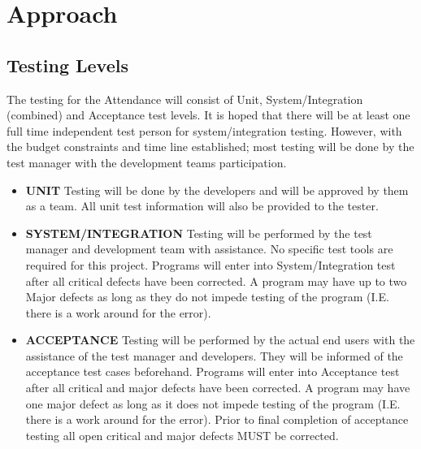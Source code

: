 \documentclass{scrreprt}
\begin{document}
\pagebreak

\chapter{Approach}

\section{Testing Levels}
The testing for the Attendance will consist of Unit, System/Integration (combined) and Acceptance test levels. It is hoped that there will be at least one full time independent test person for system/integration testing. However, with the budget constraints and time line established; most testing will be done by the test manager with the development teams participation.

\begin{itemize}
    \item \textbf{UNIT} Testing will be done by the developers and will be approved by them as a team. All unit test information will also be provided to the tester.
    \item \textbf{SYSTEM/INTEGRATION} Testing will be performed by the test manager and development team with assistance. No specific test tools are required for this project. Programs will enter into System/Integration test after all critical defects have been corrected. A program may have up to two Major defects as long as they do not impede testing of the program (I.E. there is a work around for the error).
    \item \textbf{ACCEPTANCE} Testing will be performed by the actual end users with the assistance of the test manager and developers. They will be informed of the acceptance test cases beforehand. Programs will enter into Acceptance test after all critical and major defects have been corrected. A program may have one major defect as long as it does not impede testing of the program (I.E. there is a work around for the error). Prior to final completion of acceptance testing all open critical and major defects MUST be corrected.
\end{itemize}
\end{document}
